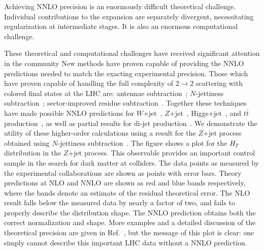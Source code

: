 \documentclass{article}
\begin{document}
Achieving NNLO precision is an enormously difficult theoretical challenge.  Individual contributions to the expansion are separately divergent, necessitating regularization at intermediate stages.  It is also an enormous computational challenge.


These theoretical and computational challenges have received significant attention in the community  New methods have proven capable of providing the NNLO predictions needed to match the exacting experimental precision.  Those which have proven capable of handling the full complexity of $2 \to 2$ scattering with colored final states at the LHC are: antennae subtraction~\cite{GehrmannDeRidder:2005cm}; $N$-jettiness subtraction~\cite{Boughezal:2015dva,Gaunt:2015pea}; sector-improved residue subtraction~\cite{Czakon:2010td,Boughezal:2011jf}.  Together these techniques have made possible NNLO predictions for $W$+jet~\cite{Boughezal:2015dva}, $Z$+jet~\cite{Ridder:2015dxa,Boughezal:2015ded}, Higgs+jet~\cite{Boughezal:2015dra,Boughezal:2015aha,Chen:2014gva}, and $t\bar{t}$ production~\cite{Czakon:2013goa}, as well as partial results for di-jet production~\cite{Ridder:2013mf}.   We demonstrate the utility of these higher-order calculations using a result for the $Z$+jet process obtained using $N$-jettiness subtraction~\cite{Boughezal:2016yfp}.   The figure shows a plot for the $H_T$ distribution in the $Z$+jet process.  This observable provides an important control sample in the search for dark matter at colliders.  The data points as measured by the experimental collaborations are shown as points with error bars.  Theory predictions at NLO and NNLO are shown as red and blue bands respectively, where the bands denote an estimate of the residual theoretical error.  The NLO result falls below the measured data by nearly a factor of two, and fails to properly describe the distribution shape.  The NNLO prediction obtains both the correct normalization and shape.  More examples and a detailed discussion of the theoretical precision are given in Ref.~\cite{Boughezal:2016yfp}, but the message of this plot is clear: one simply cannot describe this important LHC data without a NNLO prediction.  
\end{document}
